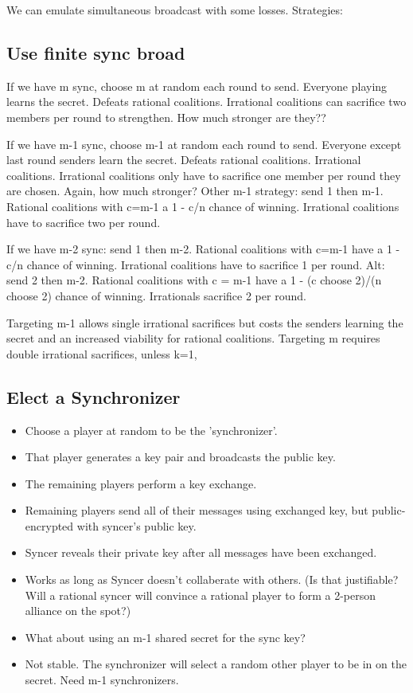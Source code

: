 \documentclass{article}
\begin{document}
We can emulate simultaneous broadcast with some losses. Strategies:

\subsection{Use finite sync broad}
If we have m sync, choose m at random each round to send. Everyone playing learns the secret. Defeats rational coalitions. Irrational coalitions can sacrifice two members per round to strengthen. How much stronger are they??

If we have m-1 sync, choose m-1 at random each round to send. Everyone except last round senders learn the secret. Defeats rational coalitions. Irrational coalitions. Irrational coalitions only have to sacrifice one member per round they are chosen. Again, how much stronger?
Other m-1 strategy: send 1 then m-1. Rational coalitions with c=m-1 a 1 - c/n chance of winning. Irrational coalitions have to sacrifice two per round.

If we have m-2 sync: send 1 then m-2. Rational coalitions with c=m-1 have a 1 - c/n chance of winning. Irrational coalitions have to sacrifice 1 per round.
Alt: send 2 then m-2. Rational coalitions with c = m-1 have a 1 - (c choose 2)/(n choose 2) chance of winning. Irrationals sacrifice 2 per round.

Targeting m-1 allows single irrational sacrifices but costs the senders learning the secret and an increased viability for rational coalitions.
Targeting m requires double irrational sacrifices, unless k=1,  

\subsection{Elect a Synchronizer}
\begin{itemize}
	\item Choose a player at random to be the 'synchronizer'.
	\item That player generates a key pair and broadcasts the public key.
	\item The remaining players perform a key exchange.
	\item Remaining players send all of their messages using exchanged key, but public-encrypted with syncer's public key.
	\item Syncer reveals their private key after all messages have been exchanged.
	\item Works as long as Syncer doesn't collaberate with others. (Is that justifiable? Will a rational syncer will convince a rational player to form a 2-person alliance on the spot?)
	\item What about using an m-1 shared secret for the sync key?
	\item Not stable. The synchronizer will select a random other player to be in on the secret. Need m-1 synchronizers.
\end{itemize}
\end{document}
